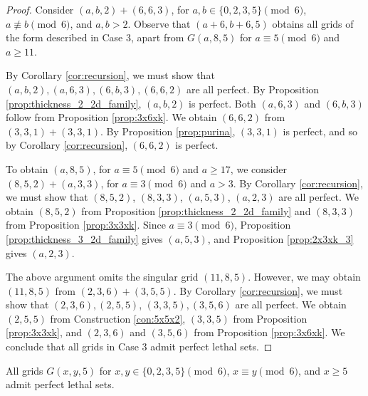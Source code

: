 \begin{proof}
Consider $(a,b,2) + (6,6,3)$, for $a,b \in \{0,2,3,5\} \pmod 6$, $a \not\equiv b \pmod 6$, and $a,b > 2$. Observe that $(a+6,b+6,5)$ obtains all grids of the form described in Case 3, apart from $G(a,8,5)$ for $a \equiv 5 \pmod 6$ and $a \geq 11$.

By Corollary \ref{cor:recursion}, we must show that $(a,b,2), (a,6,3), (6,b,3), (6,6,2)$ are all perfect. By Proposition \ref{prop:thickness_2_2d_family}, $(a,b,2)$ is perfect. Both $(a,6,3)$ and $(6,b,3)$ follow from Proposition \ref{prop:3x6xk}. We obtain $(6,6,2)$ from $(3,3,1)+(3,3,1)$. By Proposition \ref{prop:purina}, $(3,3,1)$ is perfect, and so by Corollary \ref{cor:recursion}, $(6,6,2)$ is perfect.

To obtain $(a,8,5)$, for $a \equiv 5 \pmod 6$ and $a \geq 17$, we consider $(8,5,2) + (a,3,3)$, for $a \equiv 3 \pmod 6$ and $a>3$. By Corollary \ref{cor:recursion}, we must show that $(8,5,2)$, $(8,3,3)$, $(a,5,3)$, $(a,2,3)$ are all perfect. We obtain $(8,5,2)$ from Proposition \ref{prop:thickness_2_2d_family} and $(8,3,3)$ from Proposition \ref{prop:3x3xk}. Since $a \equiv 3 \pmod 6$, Proposition \ref{prop:thickness_3_2d_family} gives $(a,5,3)$, and Proposition \ref{prop:2x3xk_3} gives $(a,2,3)$. 

The above argument omits the singular grid $(11,8,5)$. However, we may obtain $(11,8,5)$ from $(2,3,6)+(3,5,5)$. By Corollary \ref{cor:recursion}, we must show that $(2,3,6), (2,5,5)$, $(3,3,5), (3,5,6)$ are all perfect. We obtain $(2,5,5)$ from Construction \ref{con:5x5x2}, $(3,3,5)$ from Proposition \ref{prop:3x3xk}, and $(2,3,6)$ and $(3,5,6)$ from Proposition \ref{prop:3x6xk}. We conclude that all grids in Case 3 admit perfect lethal sets.
\end{proof}

\begin{lem}
\label{lem:thickness_5_case_4}
All grids $G(x,y,5)$ for $x,y \in \{0,2,3,5\} \pmod 6$, $x \equiv y \pmod 6$, and $x \geq 5$ admit perfect lethal sets.
\end{lem}

